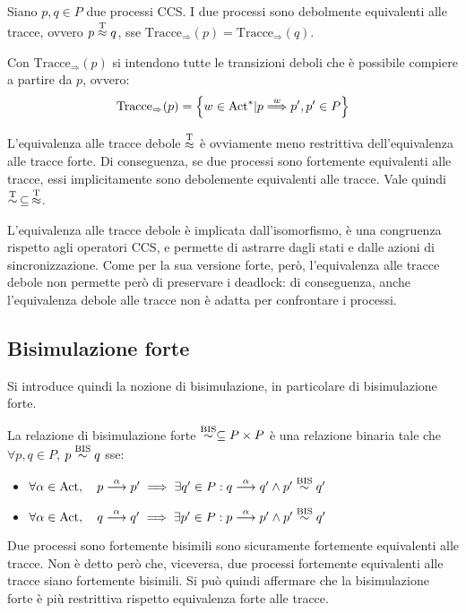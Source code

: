 \begin{defn}
    Siano $p, q \in P$ due processi CCS. I due processi sono
    debolmente equivalenti alle tracce, ovvero $p \overset{\textnormal{T}}{\approx} q$, sse
    $\text{Tracce}_{\Rightarrow}(p) = \text{Tracce}_{\Rightarrow}(q)$.

    Con $\text{Tracce}_{\Rightarrow}(p)$ si intendono tutte le transizioni deboli
    che è possibile compiere a partire da $p$, ovvero:
    \[
        \text{Tracce}_{\Rightarrow}(p) = \left\{w \in \text{Act}^* |
        p \overset{w}{\Longrightarrow} p', p' \in P\right\}
    \]
\end{defn}

L'equivalenza alle tracce debole $\overset{\textnormal{T}}{\approx}$ è ovviamente meno restrittiva dell'equivalenza
alle tracce forte.
Di conseguenza, se due processi sono fortemente equivalenti alle tracce,
essi implicitamente sono debolemente equivalenti alle tracce. Vale quindi
$\overset{\textnormal{T}}{\sim} \, \subseteq \, \overset{\textnormal{T}}{\approx}$.

L'equivalenza alle tracce debole è implicata dall'isomorfismo,
è una congruenza rispetto agli operatori CCS, e permette di astrarre
dagli stati e dalle azioni di sincronizzazione.
Come per la sua versione forte, però, l'equivalenza alle tracce debole non
permette però di preservare i deadlock: di conseguenza, anche l'equivalenza
debole alle tracce non è adatta per confrontare i processi.

\subsection*{Bisimulazione forte}
Si introduce quindi la nozione di bisimulazione, in particolare di bisimulazione
forte.

\begin{defn}
    La relazione di bisimulazione forte
    $\overset{\textnormal{BIS}}{\sim} \subseteq P \times P$
    è una relazione binaria tale che $\forall p, q \in P$, $p \overset{\textnormal{BIS}}{\sim} q$ sse:
    \begin{itemize}
        \item $\forall \alpha \in \text{Act}, \quad p \overset{\alpha}{\longrightarrow} p'
        \implies \exists q' \in P : q \overset{\alpha}{\longrightarrow} q' \land p' \overset{\textnormal{BIS}}{\sim} q'$
        \item $\forall \alpha \in \text{Act}, \quad q \overset{\alpha}{\longrightarrow} q'
        \implies \exists p' \in P : p \overset{\alpha}{\longrightarrow} p' \land p' \overset{\textnormal{BIS}}{\sim} q'$
    \end{itemize}
\end{defn}

\begin{rem}
    Due processi sono fortemente bisimili sono sicuramente fortemente
    equivalenti alle tracce.
    Non è detto però che, viceversa, due processi fortemente equivalenti
    alle tracce siano fortemente bisimili.
    Si può quindi affermare che la bisimulazione forte è più restrittiva
    rispetto equivalenza forte alle tracce.
\end{rem}

